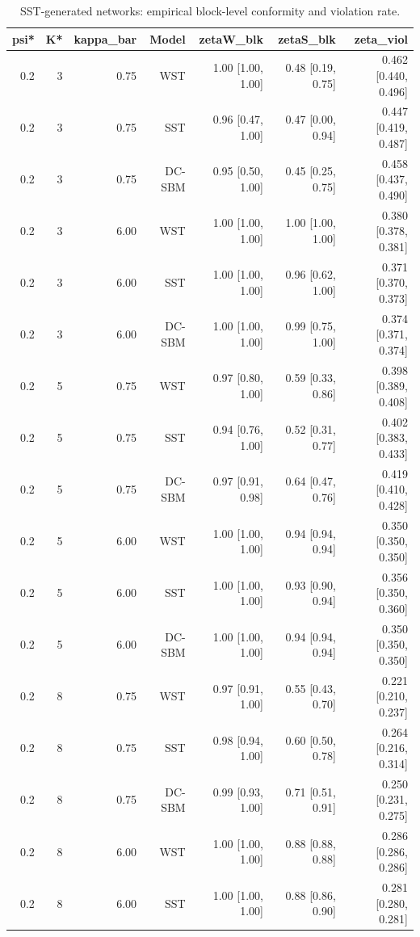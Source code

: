 \begin{table}[!h]
\centering
\caption{SST-generated networks: empirical block-level conformity and violation rate.\\\label{tab:order-sst-full-simulation-crossfit-final-DemoKvar-run-20260224-155823}}
\centering
\begin{tabular}[t]{rrrrrrr}
\toprule
psi* & K* & kappa_bar & Model & zetaW_blk & zetaS_blk & zeta_viol\\
\midrule
0.2 & 3 & 0.75 & WST & 1.00 [1.00, 1.00] & 0.48 [0.19, 0.75] & 0.462 [0.440, 0.496]\\
0.2 & 3 & 0.75 & SST & 0.96 [0.47, 1.00] & 0.47 [0.00, 0.94] & 0.447 [0.419, 0.487]\\
0.2 & 3 & 0.75 & DC-SBM & 0.95 [0.50, 1.00] & 0.45 [0.25, 0.75] & 0.458 [0.437, 0.490]\\
0.2 & 3 & 6.00 & WST & 1.00 [1.00, 1.00] & 1.00 [1.00, 1.00] & 0.380 [0.378, 0.381]\\
0.2 & 3 & 6.00 & SST & 1.00 [1.00, 1.00] & 0.96 [0.62, 1.00] & 0.371 [0.370, 0.373]\\
0.2 & 3 & 6.00 & DC-SBM & 1.00 [1.00, 1.00] & 0.99 [0.75, 1.00] & 0.374 [0.371, 0.374]\\
0.2 & 5 & 0.75 & WST & 0.97 [0.80, 1.00] & 0.59 [0.33, 0.86] & 0.398 [0.389, 0.408]\\
0.2 & 5 & 0.75 & SST & 0.94 [0.76, 1.00] & 0.52 [0.31, 0.77] & 0.402 [0.383, 0.433]\\
0.2 & 5 & 0.75 & DC-SBM & 0.97 [0.91, 0.98] & 0.64 [0.47, 0.76] & 0.419 [0.410, 0.428]\\
0.2 & 5 & 6.00 & WST & 1.00 [1.00, 1.00] & 0.94 [0.94, 0.94] & 0.350 [0.350, 0.350]\\
0.2 & 5 & 6.00 & SST & 1.00 [1.00, 1.00] & 0.93 [0.90, 0.94] & 0.356 [0.350, 0.360]\\
0.2 & 5 & 6.00 & DC-SBM & 1.00 [1.00, 1.00] & 0.94 [0.94, 0.94] & 0.350 [0.350, 0.350]\\
0.2 & 8 & 0.75 & WST & 0.97 [0.91, 1.00] & 0.55 [0.43, 0.70] & 0.221 [0.210, 0.237]\\
0.2 & 8 & 0.75 & SST & 0.98 [0.94, 1.00] & 0.60 [0.50, 0.78] & 0.264 [0.216, 0.314]\\
0.2 & 8 & 0.75 & DC-SBM & 0.99 [0.93, 1.00] & 0.71 [0.51, 0.91] & 0.250 [0.231, 0.275]\\
0.2 & 8 & 6.00 & WST & 1.00 [1.00, 1.00] & 0.88 [0.88, 0.88] & 0.286 [0.286, 0.286]\\
0.2 & 8 & 6.00 & SST & 1.00 [1.00, 1.00] & 0.88 [0.86, 0.90] & 0.281 [0.280, 0.281]\\

\end{tabular}
\end{table}
